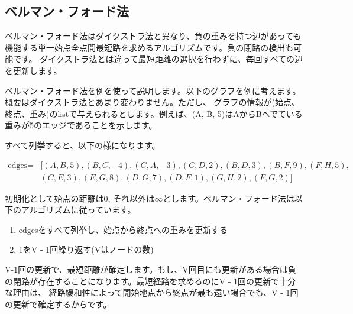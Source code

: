 \newpage

\subsection{ベルマン・フォード法}
ベルマン・フォード法はダイクストラ法と異なり、負の重みを持つ辺があっても機能する単一始点全点間最短路を求めるアルゴリズムです。負の閉路の検出も可能です。
ダイクストラ法とは違って最短距離の選択を行わずに、毎回すべての辺を更新します。

ベルマン・フォード法を例を使って説明します。以下のグラフを例に考えます。概要はダイクストラ法とあまり変わりません。ただし、
グラフの情報が(始点、終点、重み)のlistで与えられるとします。例えば、(A, B, 5)はAからBへでている重みが5のエッジであることを示します。

すべて列挙すると、以下の様になります。

\begin{equation*}
  \begin{aligned}
    \text{edges} =
    &[(A, B, 5), (B, C, -4), (C, A, -3), (C, D, 2), (B, D, 3), (B, F, 9), (F, H, 5), \\
    &(C, E, 3), (E, G, 8), (D, G, 7), (D, F, 1), (G, H, 2), (F, G, 2)]
  \end{aligned}
\end{equation*}

初期化として始点の距離は0, それ以外は$\infty$とします。ベルマン・フォード法は以下のアルゴリズムに従っています。

\begin{enumerate}
  \item edgesをすべて列挙し、始点から終点への重みを更新する
  \item 1をV - 1回繰り返す(Vはノードの数)
\end{enumerate}

V-1回の更新で、最短距離が確定します。もし、V回目にも更新がある場合は負の閉路が存在することになります。最短経路を求めるのにV - 1回の更新で十分な理由は、
経路緩和性によって開始地点から終点が最も遠い場合でも、V - 1回の更新で確定するからです。

